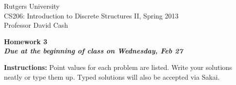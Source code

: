 \documentclass[11pt]{article}
\begin{document}
\sloppy

\noindent Rutgers University\\
CS206: Introduction to Discrete Structures II, Spring 2013\\
Professor David Cash\\

\begin{center}
\LARGE{\textbf{Homework 3}}\\
\large{\textbf{\emph{Due at the beginning of class on Wednesday, Feb 27}}}
\end{center}

\vspace{.1in}

\noindent\textbf{Instructions:} Point values for each problem are listed.
Write your solutions neatly or type them up.  Typed solutions will also be
accepted via Sakai.
\end{document}
